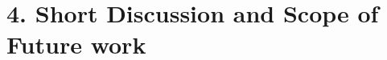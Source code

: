 \documentclass[two-column, nofootinbib]{revtex4-1}
\begin{document}













\section*{4. Short Discussion and Scope of Future work}
\end{document}
